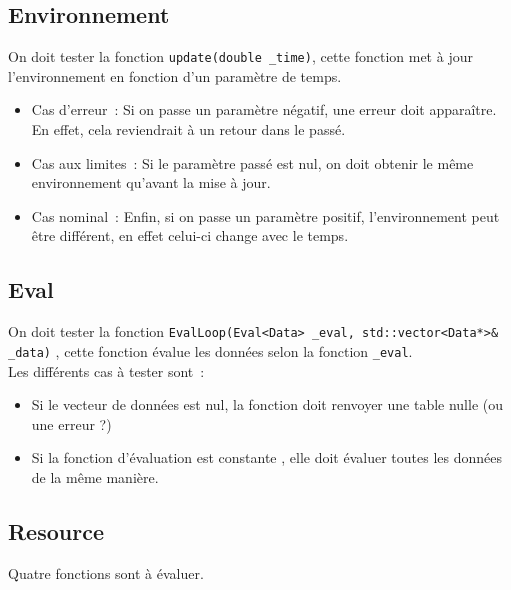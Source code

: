 
\subsection{Environnement}

On doit tester la fonction \texttt{update(double \_time)}, cette fonction met à jour l'environnement en fonction d'un paramètre de temps.\\

\begin{itemize}
\item Cas d'erreur~: Si on passe un paramètre négatif, une erreur doit apparaître. En effet, cela reviendrait à un retour dans le passé.
\item Cas aux limites~: Si le paramètre passé est nul, on doit obtenir le même environnement qu'avant la mise à jour.
\item Cas nominal~: Enfin, si on passe un paramètre positif, l'environnement peut être différent, en effet celui-ci change avec le temps.
\end{itemize}

\subsection{Eval}

On doit tester la fonction \texttt{EvalLoop(Eval<Data> \_eval, std::vector<Data*>\& \_data)} , cette fonction évalue les données selon la fonction \texttt{\_eval}.\\

Les différents cas à tester sont~:
\begin{itemize}
\item Si le vecteur de données est nul, la fonction doit renvoyer une table nulle (ou une erreur ?)
\item Si la fonction d'évaluation est \og constante \fg, elle doit évaluer toutes les données de la même manière.
\end{itemize}

\subsection{Resource}

Quatre fonctions sont à évaluer.\\

